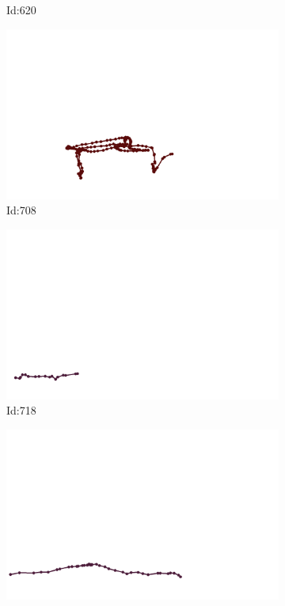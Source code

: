 \documentclass[12pt,twoside]{report}
\begin{document}
\begin{figure}
\begin{subfigure}[b]{0.20\textwidth}
\caption{Id:620}
\end{subfigure}
\begin{subfigure}[b]{0.20\textwidth}
\centering
\includegraphics[width=\textwidth]{../trajectories/708.png}
\caption{Id:708}
\end{subfigure}
\begin{subfigure}[b]{0.20\textwidth}
\centering
\includegraphics[width=\textwidth]{../trajectories/718.png}
\caption{Id:718}
\end{subfigure}
\begin{subfigure}[b]{0.20\textwidth}
\centering
\includegraphics[width=\textwidth]{../trajectories/725.png}

\end{subfigure}
\end{figure}
\end{document}
